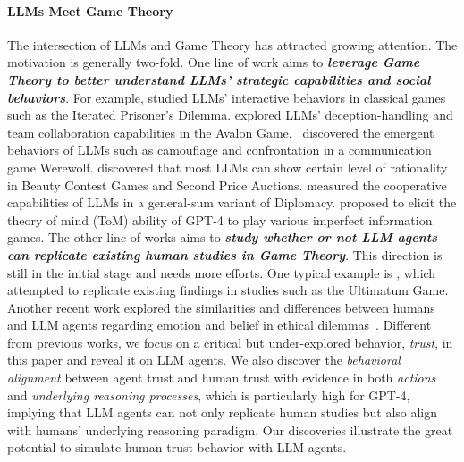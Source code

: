 \paragraph{LLMs Meet Game Theory} 
The intersection of LLMs and Game Theory has attracted growing attention. The motivation is generally two-fold. One line of work aims to \textbf{\textit{leverage Game Theory to better understand LLMs' strategic capabilities and social behaviors}}. For example, \citet{akata2023playing,fan2023can,brookins2023playing} studied LLMs' interactive behaviors in classical games such as the Iterated Prisoner’s Dilemma. \citet{wang2023avalon,lan2023llm,light2023text,shi2023cooperation} explored LLMs' deception-handling and team collaboration capabilities in the Avalon Game.~\citet{xu2023exploring} discovered the emergent behaviors of LLMs such as camouflage and confrontation in a communication game Werewolf.
\citet{guo2024economics} discovered that most LLMs can show certain level of rationality in Beauty Contest Games and Second Price Auctions. \citet{mukobi2023welfare} measured the cooperative capabilities of LLMs in a general-sum variant of Diplomacy.
\citet{guo2023suspicion} proposed to elicit the theory of
mind (ToM) ability of GPT-4 to play various imperfect information games.
The other line of works aims to \textbf{\textit{study whether or not LLM agents can replicate existing human studies in Game Theory}}. This direction is still in the initial stage and needs more efforts. One typical example is \citep{aher2023using}, which attempted to replicate existing findings in studies such as the Ultimatum Game. Another recent work explored the similarities and differences between humans and LLM agents regarding emotion and belief in ethical dilemmas~\citep{lei2024fairmindsim}.
Different from previous works, we focus on a critical but under-explored behavior, \textit{trust}, in this paper and reveal it on LLM agents. 
We also discover the \textit{behavioral alignment} between agent trust and human trust with evidence in both \textit{actions} and \textit{underlying reasoning processes}, which is particularly high for GPT-4, implying that LLM agents can not only replicate human studies but also align with humans' underlying reasoning paradigm. Our discoveries illustrate the great potential to simulate human trust  behavior with LLM agents.























